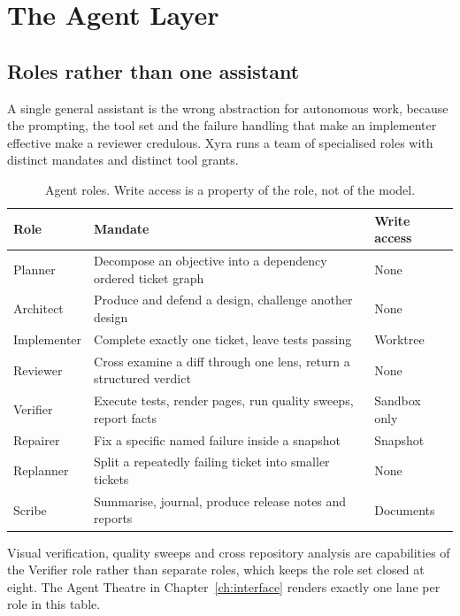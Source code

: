 \chapter{The Agent Layer}
\label{ch:agents}

\section{Roles rather than one assistant}

A single general assistant is the wrong abstraction for autonomous work, because the
prompting, the tool set and the failure handling that make an implementer effective make a
reviewer credulous. Xyra runs a team of specialised roles with distinct mandates and distinct
tool grants.

\begin{table}[h]
\centering
\small
\begin{tabularx}{\textwidth}{l X l}
\toprule
\textbf{Role} & \textbf{Mandate} & \textbf{Write access} \\
\midrule
Planner & Decompose an objective into a dependency ordered ticket graph & None \\
Architect & Produce and defend a design, challenge another design & None \\
Implementer & Complete exactly one ticket, leave tests passing & Worktree \\
Reviewer & Cross examine a diff through one lens, return a structured verdict & None \\
Verifier & Execute tests, render pages, run quality sweeps, report facts & Sandbox only \\
Repairer & Fix a specific named failure inside a snapshot & Snapshot \\
Replanner & Split a repeatedly failing ticket into smaller tickets & None \\
Scribe & Summarise, journal, produce release notes and reports & Documents \\
\bottomrule
\end{tabularx}
\caption{Agent roles. Write access is a property of the role, not of the model.}
\label{tab:roles}
\end{table}

Visual verification, quality sweeps and cross repository analysis are capabilities of the
Verifier role rather than separate roles, which keeps the role set closed at eight. The Agent
Theatre in Chapter~\ref{ch:interface} renders exactly one lane per role in this table.

